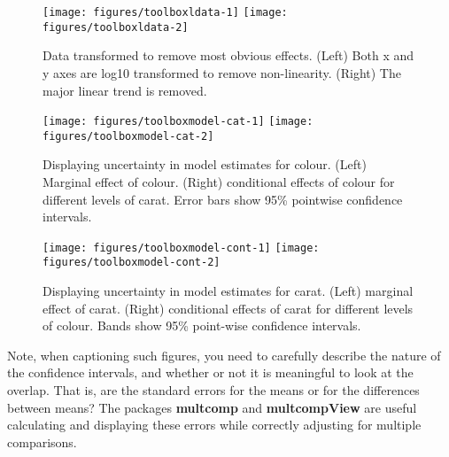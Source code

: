 \begin{figure}

{\centering \texttt{[image: figures/toolboxldata-1]} \texttt{[image: figures/toolboxldata-2]} 

}

\caption{Data transformed to remove most obvious effects. (Left) Both x and y axes are log10 transformed to remove non-linearity. (Right) The major linear trend is removed.\label{fig:ldata}}
\end{figure}

\begin{figure}

{\centering \texttt{[image: figures/toolboxmodel-cat-1]} \texttt{[image: figures/toolboxmodel-cat-2]} 

}

\caption{Displaying uncertainty in model estimates for colour. (Left) Marginal effect of colour. (Right) conditional effects of colour for different levels of carat. Error bars show 95\% pointwise confidence intervals.\label{fig:model-cat}}
\end{figure}

\begin{figure}

{\centering \texttt{[image: figures/toolboxmodel-cont-1]} \texttt{[image: figures/toolboxmodel-cont-2]} 

}

\caption{Displaying uncertainty in model estimates for carat. (Left) marginal effect of carat. (Right) conditional effects of carat for different levels of colour. Bands show 95\% point-wise confidence intervals.\label{fig:model-cont}}
\end{figure}

Note, when captioning such figures, you need to carefully describe the
nature of the confidence intervals, and whether or not it is meaningful
to look at the overlap. That is, are the standard errors for the means
or for the differences between means? The packages \textbf{multcomp} and
\textbf{multcompView} are useful calculating and displaying these errors
while correctly adjusting for multiple comparisons.
 


